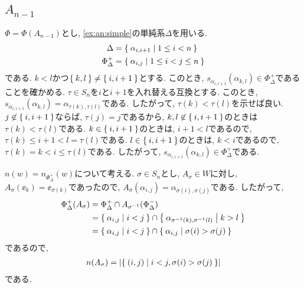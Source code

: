 \subsection{$A_{n-1}$}
$\Phi=\Phi(A_{n-1})$とし,
\cref{ex:an:simple}の単純系$\Delta$を用いる.
\begin{align*}
  \Delta&=\Set{\alpha_{i,i+1}|1\leq i < n}\\
  \Phi_\Delta^+&=\Set{\alpha_{i,j}|1\leq i<j \leq n}
\end{align*}
である.
$k<l$かつ$\Set{k,l}\neq \Set{i,i+1}$とする.
このとき,
$s_{\alpha_{i,i+1}}(\alpha_{k,l})\in\Phi_\Delta^+$であることを確かめる.
$\tau\in S_n$を$i$と$i+1$を入れ替える互換とする.
このとき, $s_{\alpha_{i,i+1}}(\alpha_{k,l})=\alpha_{\tau(k),\tau(l)}$である.
したがって, $\tau(k)<\tau(l)$を示せば良い.
$j\not\in\Set{i,i+1}$ならば, $\tau(j)=j$であるから,
$k,l\not\in\Set{i,i+1}$のときは$\tau(k)<\tau(l)$である.
$k\in\Set{i,i+1}$のときは,
$i+1< l$であるので, $\tau(k)\leq i+1<l=\tau(l)$である.
$l\in\Set{i,i+1}$のときは,
$k<i$であるので, $\tau(k)= k<i\leq \tau(l)$である.
したがって,
$s_{\alpha_{i,i+1}}(\alpha_{k,l})\in\Phi_\Delta^+$である.

$n(w)=n_{\Phi_\Delta^+}(w)$について考える.
$\sigma\in S_n$とし, $A_\sigma\in W$に対し,
$A_\sigma (\ee_k)=\ee_{\sigma(k)}$であったので,
$A_\sigma(\alpha_{i,j})=\alpha_{\sigma(i),\sigma(j)}$である.
したがって,
\begin{align*}
  \Phi_\Delta^+(A_\sigma)
  &=\Phi_\Delta^+\cap A_{\sigma^{-1}}(\Phi_\Delta^-)\\
  &=\Set{\alpha_{i,j}| i<j}\cap\Set{\alpha_{\sigma^{-1}(k),\sigma^{-1}(l)}| k>l}\\
  &=\Set{\alpha_{i,j}| i<j}\cap\Set{\alpha_{i,j}| \sigma(i)>\sigma(j)}
\end{align*}
であるので,
\begin{align*}
  n(A_\sigma)=\left|\Set{(i,j)|i<j,\sigma(i)>\sigma(j)}\right|
\end{align*}
である.

